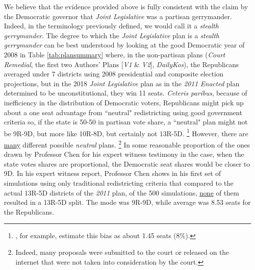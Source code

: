 \par
We believe that the evidence provided above is fully consistent with the claim by the Democratic governor that \textit{Joint Legislative} was a partisan gerrymander. Indeed, in the terminology previously defined, we would call it a \textit{stealth gerrymander}.  The degree to which the \textit{Joint Legislative} plan is a \textit{stealth gerrymander} can be best understood by looking at the good Democratic year of 2008 in Table \ref{tab:plansummary} where, in the non-partisan plans (\textit{Court Remedial}, the first two Authors’ Plans [\textit{V1} \& \textit{V2}], \textit{DailyKos}), the Republicans averaged under 7 districts using 2008 presidential and composite election projections, but in the 2018 \textit{Joint Legislative} plan as in the \textit{2011 Enacted} plan determined to be unconstitutional, they win 11 seats. \textit{Ceteris paribus}, because of inefficiency in the distribution of Democratic voters, Republicans might pick up about a one seat advantage from ``neutral" redistricting using good government criteria so, if the state is 50-50 in partisan vote share, a ``neutral" plan might not be 9R-9D, but more like 10R-8D, but certainly not 13R-5D.
        \footnote{\citet{Chen2013}, for example, estimate this bias as about 1.45 seats (8\%).  }
However, there are \underline{many} different possible \textit{neutral} plans.
        \footnote{Indeed, many proposals were submitted to the court or released on the internet that were not taken into consideration by the court.}
In some reasonable proportion of the ones drawn by Professor Chen for his expert witness testimony in the case, when the state votes shares are proportional, the Democratic seat shares would be closer to 9D. In his expert witness report, Professor Chen shows in his first set of simulations using only traditional redistricting criteria that compared to the actual 13R-5D districts of the \textit{2011} plan, of the 500 simulations, \underline{none} of them resulted in a 13R-5D split. The mode was 9R-9D, while average was 8.53 seats for the Republicans.
